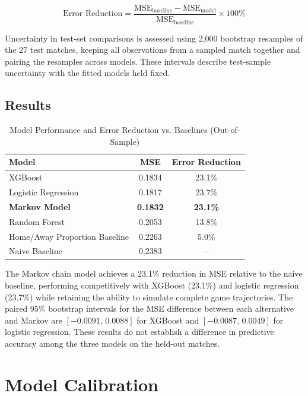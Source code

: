 \documentclass[12pt]{article}
\begin{document}
\begin{equation}
\text{Error Reduction} = \frac{\text{MSE}_{\text{baseline}} - \text{MSE}_{\text{model}}}{\text{MSE}_{\text{baseline}}} \times 100\%
\end{equation}

Uncertainty in test-set comparisons is assessed using 2,000 bootstrap resamples of the 27 test matches, keeping all observations from a sampled match together and pairing the resamples across models. These intervals describe test-sample uncertainty with the fitted models held fixed.

\subsection{Results}

\begin{table}[H]
\centering
\caption{Model Performance and Error Reduction vs. Baselines (Out-of-Sample)}
\begin{tabular}{lcc}
\hline
\textbf{Model} & \textbf{MSE} & \textbf{Error Reduction} \\
\hline
XGBoost & 0.1834 & 23.1\% \\
Logistic Regression & 0.1817 & 23.7\% \\
\textbf{Markov Model} & \textbf{0.1832} & \textbf{23.1\%} \\
Random Forest & 0.2053 & 13.8\% \\
Home/Away Proportion Baseline & 0.2263 & 5.0\% \\
Naive Baseline & 0.2383 & -- \\
\hline
\end{tabular}
\label{tab:error_reduction}
\end{table}

The Markov chain model achieves a 23.1\% reduction in MSE relative to the naive baseline, performing competitively with XGBoost (23.1\%) and logistic regression (23.7\%) while retaining the ability to simulate complete game trajectories. The paired 95\% bootstrap intervals for the MSE difference between each alternative and Markov are $[-0.0091,\,0.0088]$ for XGBoost and $[-0.0087,\,0.0049]$ for logistic regression. These results do not establish a difference in predictive accuracy among the three models on the held-out matches.


\section{Model Calibration}
\end{document}
